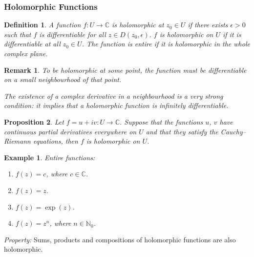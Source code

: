 \documentclass{article}
\theoremstyle{plain}\theoremheaderfont{\normalfont\itshape}\theorembodyfont{\rmfamily}\theoremseparator{.}\newtheorem*{rem}{Remark}\newtheorem*{ex}{Example}\newtheorem*{proof}{Proof}\newtheorem*{altp}{Alternative proof}
\theoremstyle{plain}\theoremheaderfont{\normalfont\bfseries}\theorembodyfont{\rmfamily}\theoremseparator{.}\newtheorem{thm}{Theorem}[section]\newtheorem{lem}[thm]{Lemma}\newtheorem{prop}[thm]{Proposition}\newtheorem*{cor}{Corollary}\newtheorem{defn}[thm]{Definition}\newtheorem{clm}[thm]{Claim}\newtheorem{clminproof}{Claim}
\theoremstyle{break}\theoremheaderfont{\normalfont\itshape}\theorembodyfont{\rmfamily}\theoremseparator{.\medskip}\newtheorem*{proofskip}{Proof}\newtheorem*{exs}{Examples}\newtheorem*{rems}{Remarks}
\theoremstyle{break}\theoremheaderfont{\normalfont\bfseries}\theorembodyfont{\rmfamily}\theoremseparator{.\medskip}\newtheorem{lemskip}[thm]{Lemma}\newtheorem{defnskip}[thm]{Definition}\newtheorem{propskip}[thm]{Proposition}\newtheorem{thmskip}[thm]{Theorem}
\numberwithin{equation}{section}
\begin{document}
	\subsubsection{Holomorphic Functions}
	\begin{defn}
		A function \(f:U\to\mathbb{C}\) is \textit{holomorphic} at \(z_0\in U\) if there exists \(\epsilon>0\) such that \(f\) is differentiable for all \(z\in D(z_0,\epsilon)\). \(f\) is \textit{holomorphic on \(U\)} if it is differentiable at all \(z_0\in U\). The function is \textit{entire} if it is holomorphic in the whole complex plane.
	\end{defn}
	\begin{rem}
		To be holomorphic at some point, the function must be differentiable on a small neighbourhood of that point.
		
		The existence of a complex derivative in a neighbourhood is a very strong condition: it implies that a holomorphic function is infinitely differentiable.
	\end{rem}
	\begin{prop}
		Let \(f=u+iv:U\to \mathbb{C}\). Suppose that the functions \(u\), \(v\) have continuous partial derivatives everywhere on \(U\) and that they satisfy the Cauchy--Riemann equations, then \(f\) is holomorphic on \(U\).
	\end{prop}
	\begin{ex}
		Entire functions:
		\begin{enumerate}[topsep=0pt]
			\item[(i)] \(f(z)=c\), where \(c\in\mathbb{C}\).
			\item[(ii)] \(f(z)=z\).
			\item[(iii)] \(f(z)=\exp(z)\).
			\item[(iv)] \(f(z)=z^n\), where \(n\in\mathbb{N}_0\).
		\end{enumerate}
	\end{ex}
	\textit{Property:} Sums, products and compositions of holomorphic functions are also holomorphic.
	
\end{document}
